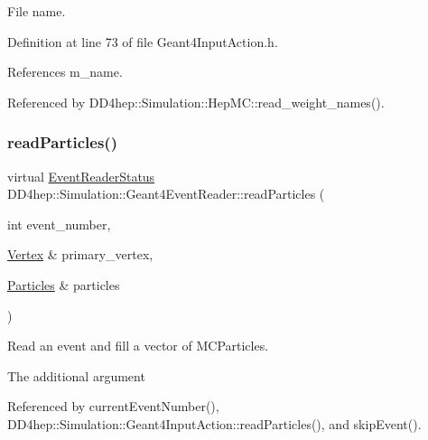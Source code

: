 File name. 



Definition at line 73 of file Geant4\+Input\+Action.\+h.



References m\+\_\+name.



Referenced by D\+D4hep\+::\+Simulation\+::\+Hep\+M\+C\+::read\+\_\+weight\+\_\+names().

\hypertarget{class_d_d4hep_1_1_simulation_1_1_geant4_event_reader_ac72f293d08b3a2cd9228f56638656613}{}\label{class_d_d4hep_1_1_simulation_1_1_geant4_event_reader_ac72f293d08b3a2cd9228f56638656613} 
\subsubsection{\texorpdfstring{read\+Particles()}{readParticles()}}
{\footnotesize\ttfamily virtual \hyperlink{class_d_d4hep_1_1_simulation_1_1_geant4_event_reader_ae4f4bc83ffcf5b0c1868ad78859851e7}{Event\+Reader\+Status} D\+D4hep\+::\+Simulation\+::\+Geant4\+Event\+Reader\+::read\+Particles (\begin{DoxyParamCaption}\item[{int}]{event\+\_\+number,  }\item[{\hyperlink{class_d_d4hep_1_1_simulation_1_1_geant4_event_reader_ac9738208fe520e5aa2ad1efa13de82e7}{Vertex} \&}]{primary\+\_\+vertex,  }\item[{\hyperlink{class_d_d4hep_1_1_simulation_1_1_geant4_event_reader_afa252e93d319aef2810a17aa78bb4603}{Particles} \&}]{particles }\end{DoxyParamCaption})\hspace{0.3cm}{\ttfamily [pure virtual]}}



Read an event and fill a vector of M\+C\+Particles. 

The additional argument 

Referenced by current\+Event\+Number(), D\+D4hep\+::\+Simulation\+::\+Geant4\+Input\+Action\+::read\+Particles(), and skip\+Event().

\hypertarget{class_d_d4hep_1_1_simulation_1_1_geant4_event_reader_a9381626ad4f4fa20e304414f6654ee03}{}\label{class_d_d4hep_1_1_simulation_1_1_geant4_event_reader_a9381626ad4f4fa20e304414f6654ee03} 
